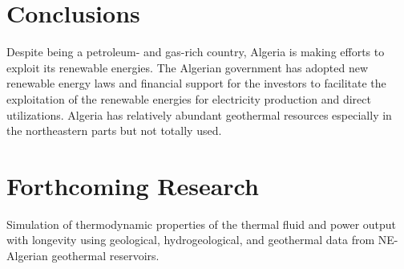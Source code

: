 \documentclass[a0,portrait]{a0poster}
\begin{document}
\begin{multicols}{2}

    \color{SaddleBrown} %

    \section*{Conclusions}
    Despite being a petroleum- and gas-rich country, Algeria is making efforts to exploit its renewable energies. The Algerian government has adopted new renewable energy laws and financial support for the investors to facilitate the exploitation of the renewable energies for electricity production and direct utilizations. Algeria has relatively abundant geothermal resources especially in the northeastern parts but not totally used.
    \color{Black} %


    \section*{Forthcoming Research}

    Simulation of thermodynamic properties of the thermal fluid and power output with longevity using geological, hydrogeological, and geothermal data from NE-Algerian geothermal reservoirs.




\end{multicols}
\end{document}
